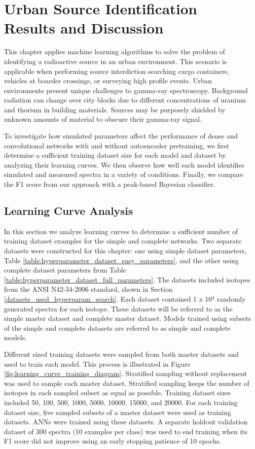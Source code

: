 \chapter{Urban Source Identification Results and Discussion} \label{UrbanSourceIdentificationResultsandDiscussion}


This chapter applies machine learning algorithms to solve the problem of identifying a radioactive source in an urban environment. This scenario is applicable when performing source interdiction searching cargo containers, vehicles at boarder crossings, or surveying high profile events. Urban environments present unique challenges to gamma-ray spectroscopy. Background radiation can change over city blocks due to different concentrations of uranium and thorium in building materials. Sources may be purposely shielded by unknown amounts of material to obscure their gamma-ray signal. 

To investigate how simulated parameters affect the performance of dense and convolutional networks with and without autoencoder pretraining, we first determine a sufficient training dataset size for each model and dataset by analyzing their learning curves. We then observe how well each model identifies simulated and measured spectra in a variety of conditions. Finally, we compare the F1 score from our approach with a peak-based Bayesian classifier.

\section{Learning Curve Analysis} \label{sectionlearningcurve}

In this section we analyze learning curves to determine a sufficient number of training dataset examples for the simple and complete networks. Two separate datasets were constructed for this chapter: one using simple dataset parameters, Table \ref{table:hyperparameter_dataset_easy_parameters}, and the other using complete dataset parameters from Table \ref{table:hyperparameter_dataset_full_parameters}. The datasets included isotopes from the ANSI N42-34-2006 standard, shown in Section \ref{datasets_used_hyperparam_search}. Each dataset contained 1 x 10$^{4}$ randomly generated spectra for each isotope. These datasets will be referred to as the simple master dataset and complete master dataset. Models trained using subsets of the simple and complete datasets are referred to as simple and complete models.

Different sized training datasets were sampled from both master datasets and used to train each model. This process is illustrated in Figure \ref{fig:learning_curve_training_diagram}. Stratified sampling without replacement was used to sample each master dataset. Stratified sampling keeps the number of isotopes in each sampled subset as equal as possible. Training dataset sizes included 50, 100, 500, 1000, 5000, 10000, 15000, and 20000. For each training dataset size, five sampled subsets of a master dataset were used as training datasets. ANNs were trained using these datasets. A separate holdout validation dataset of 300 spectra (10 examples per class) was used to end training when its F1 score did not improve using an early stopping patience of 10 epochs.

